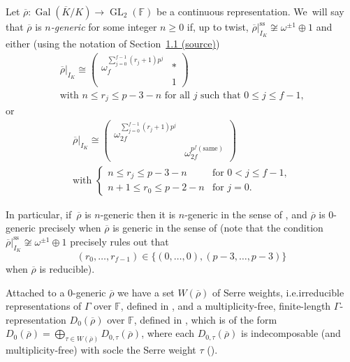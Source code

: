 \documentclass[10pt]{amsart}
\newcommand{\ie}{i.e.}
\let\ovl\overline
\newcommand{\F}{\mathbb{F}}
\renewcommand{\ss}{\mathrm{ss}}
\newcommand{\rhobar}{\overline{\rho}}
\newcommand{\brho}{\overline{\rho}}
\DeclareMathOperator{\Gal}{Gal}
\DeclareMathOperator{\GL}{GL}
\theoremstyle{plain}
\theoremstyle{definition}
\let\sourceLocalRef\ref
\renewcommand{\ref}[1]{\ifstrequal{#1}{sec:results}{\href{https://doi.org/10.5802/jep.346}{1.1 (source)}}{\ifstrequal{#1}{sec:subquot-ss}{\href{https://doi.org/10.5802/jep.346}{5 (source)}}{\ifstrequal{#1}{eq:1st-term}{\href{https://doi.org/10.5802/jep.346}{6 (source)}}{\ifstrequal{#1}{cor:gr-pi'}{\href{https://doi.org/10.5802/jep.346}{6.1.7 (source)}}{\sourceLocalRef{#1}}}}}}
\begin{document}
Let $\brho:\Gal(\ovl K/K)\to \GL_2(\F)$ be a continuous representation. We~will say that $\rhobar$ is \emph{$n$-generic} for some integer $n \ge 0$ if, up to twist, $\rhobar|_{I_K}^{\ss}\not\cong \omega^{\pm 1}\oplus 1$ and either (using the notation of Section~\ref{sec:results})\vspace*{-3pt}
\begin{multline}\label{eq:rhobar-generic-red}
\rhobar|_{I_K} \cong \begin{pmatrix}\omega_f^{\sum_{j=0}^{f-1} (r_j+1) p^j} & * \\ & 1\end{pmatrix}\\
\text{with $n \leq r_j \leq p-3-n$ for all $j$ such that $0 \le j \le f-1$,}
\end{multline}
or\vspace*{-3pt}
\begin{multline}\label{eq:rhobar-generic-irred}
\rhobar|_{I_K} \cong \begin{pmatrix}\omega_{2f}^{\sum_{j=0}^{f-1} (r_j+1) p^j} & \\ & \omega_{2f}^{p^f(\text{same})}\end{pmatrix} \\ \text{with\ }
\begin{cases}
n \leq r_j \leq p-3-n &\text{for $0 < j \le f-1$,} \\ n+1 \leq r_0 \leq p-2-n & \text{for $j = 0$.}
\end{cases}
\end{multline}

In particular, if~$\rhobar$ is $n$-generic then it is $n$-generic in the sense of \cite[Def.\,2.3.4]{BHHMS1}, and $\rhobar$ is $0$-generic precisely when $\rhobar$ is generic in the sense of \cite[Def.\,11.7]{BP} (note that the condition $\rhobar|_{I_K}^{\ss}\not\cong \omega^{\pm 1}\oplus 1$ precisely rules out that\vspace*{-3pt}
\[
(r_0,\dots,r_{f-1})\in\{(0,\dots,0),(p-3,\dots,p-3)\}
\]
when $\rhobar$ is reducible).

Attached to a $0$-generic $\rhobar$ we have a set $W(\rhobar)$ of Serre weights, \ie irreducible representations of $\Gamma$ over $\F$, defined in \cite[\S 3]{BDJ}, and a multiplicity-free, finite-length $\Gamma$-representation $D_0(\rhobar)$ over $\F$, defined in \cite[\S 13]{BP}, which is of the form $D_0(\rhobar)=\bigoplus_{\tau\in W(\rhobar)}D_{0,\tau}(\rhobar)$, where each $D_{0,\tau}(\rhobar)$ is indecomposable (and multiplicity-free) with socle the Serre weight $\tau$ (\cite[\S 15]{BP}).
\end{document}
